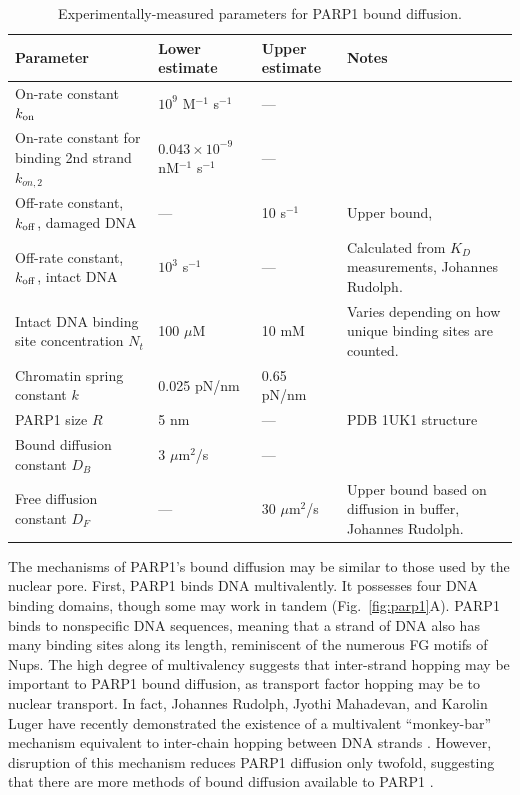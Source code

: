 \begin{table}[b]
  \caption[Experimentally-measured parameters for PARP1 bound diffusion.]{Experimentally-measured parameters for PARP1 bound diffusion.}
    \label{table:parp1}
    \begin{tabular}{p{5cm}p{3cm}p{2.7cm}p{5.4cm}}
      Parameter & Lower estimate & Upper estimate  & Notes\\
      \hline
	On-rate constant $k_{\rm on}$ & $10^9$ M$^{-1}$ s$^{-1}$  & ---  & \cite{rudolph18}\\ \hline
On-rate constant for binding 2nd strand $k_{on,2}$ & $0.043 \times 10^{-9}$ nM$^{-1}$ s$^{-1}$  & ---  & \cite{rudolph18}\\ \hline
	Off-rate constant, $k_{\rm off}$, damaged DNA & --- & 10 s$^{-1}$  & Upper bound, \cite{rudolph18} \\ \hline
	Off-rate constant, $k_{\rm off}$, intact DNA & $10^3$ s$^{-1}$ & ---  & Calculated from  $K_D$ measurements, Johannes Rudolph.\\ \hline
	Intact DNA binding site concentration $N_t$ & 100 $\mu$M & 10 mM & Varies depending on how unique binding sites are counted.\\ \hline
	Chromatin spring constant $k$ & 0.025 pN/nm & 0.65 pN/nm  & \cite{kruithof09, norouzi18}\\ \hline
	PARP1 size $R$ & 5 nm & ---  & PDB 1UK1 structure\\ \hline
	Bound diffusion constant $D_B$ & 3 $\mu$m$^2$/s & ---  & \cite{mahadevan18}\\ \hline
	Free diffusion constant $D_F$ & --- & 30 $\mu$m$^2$/s  & Upper bound based on diffusion in buffer, Johannes Rudolph.\\
 \hline
    \end{tabular}
\end{table}

The mechanisms of PARP1's bound diffusion may be similar to those used by the nuclear pore.  First, PARP1 binds DNA multivalently.  It possesses four DNA binding domains, though some may work in tandem (Fig.~\ref{fig:parp1}A).  PARP1 binds to nonspecific DNA sequences, meaning that a strand of DNA also has many binding sites along its length, reminiscent of the numerous FG motifs of Nups.  The high degree of multivalency suggests that inter-strand hopping may be important to PARP1 bound diffusion, as transport factor hopping may be to nuclear transport.  In fact, Johannes Rudolph, Jyothi Mahadevan, and Karolin Luger have recently demonstrated the existence of a multivalent ``monkey-bar'' mechanism equivalent to inter-chain hopping between DNA strands \cite{rudolph18}.  However, disruption of this mechanism reduces PARP1 diffusion only twofold, suggesting that there are more methods of bound diffusion available to PARP1 \cite{mahadevan18}.



